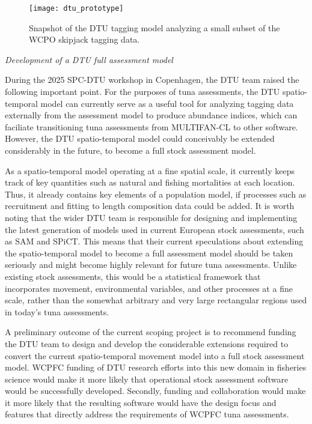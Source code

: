 \documentclass{SCreport}
\begin{document}
\begin{figure}
  \centering
  \texttt{[image: dtu\_prototype]}
  \caption{Snapshot of the DTU tagging model analyzing a small subset of the
    WCPO skipjack tagging data.\label{fig:dtu-prototype}}
\end{figure}

\vspace{2ex}

\textit{Development of a DTU full assessment model}

During the 2025 SPC-DTU workshop in Copenhagen, the DTU team raised the
following important point. For the purposes of tuna assessments, the DTU
spatio-temporal model can currently serve as a useful tool for analyzing tagging
data externally from the assessment model to produce abundance indices, which
can faciliate transitioning tuna assessments from MULTIFAN-CL to other software.
However, the DTU spatio-temporal model could conceivably be extended
considerably in the future, to become a full stock assessment model.

As a spatio-temporal model operating at a fine spatial scale, it currently keeps
track of key quantities such as natural and fishing mortalities at each
location. Thus, it already contains key elements of a population model, if
processes such as recruitment and fitting to length composition data could be
added. It is worth noting that the wider DTU team is responsible for designing
and implementing the latest generation of models used in current European stock
assessments, such as SAM and SPiCT. This means that their current speculations
about extending the spatio-temporal model to become a full assessment model
should be taken seriously and might become highly relevant for future tuna
assessments. Unlike existing stock assessments, this would be a statistical
framework that incorporates movement, environmental variables, and other
processes at a fine scale, rather than the somewhat arbitrary and very large
rectangular regions used in today's tuna assessments.

A preliminary outcome of the current scoping project is to recommend funding the
DTU team to design and develop the considerable extensions required to convert
the current spatio-temporal movement model into a full stock assessment model.
WCPFC funding of DTU research efforts into this new domain in fisheries science
would make it more likely that operational stock assessment software would be
successfully developed. Secondly, funding and collaboration would make it more
likely that the resulting software would have the design focus and features that
directly address the requirements of WCPFC tuna assessments.
\end{document}
